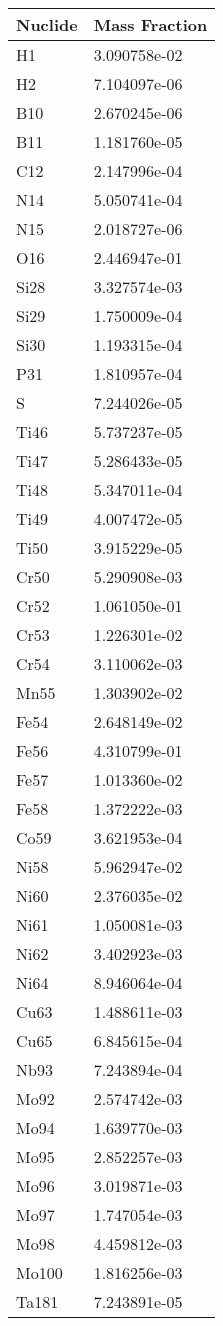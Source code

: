 \begin{centering}
\begin{longtable}[ht!]
{ p{} | p{} }
\hline
Nuclide & Mass Fraction\\
\hline
H1 & 3.090758e-02\\
H2 & 7.104097e-06\\
B10 & 2.670245e-06\\
B11 & 1.181760e-05\\
C12 & 2.147996e-04\\
N14 & 5.050741e-04\\
N15 & 2.018727e-06\\
O16 & 2.446947e-01\\
Si28 & 3.327574e-03\\
Si29 & 1.750009e-04\\
Si30 & 1.193315e-04\\
P31 & 1.810957e-04\\
S & 7.244026e-05\\
Ti46 & 5.737237e-05\\
Ti47 & 5.286433e-05\\
Ti48 & 5.347011e-04\\
Ti49 & 4.007472e-05\\
Ti50 & 3.915229e-05\\
Cr50 & 5.290908e-03\\
Cr52 & 1.061050e-01\\
Cr53 & 1.226301e-02\\
Cr54 & 3.110062e-03\\
Mn55 & 1.303902e-02\\
Fe54 & 2.648149e-02\\
Fe56 & 4.310799e-01\\
Fe57 & 1.013360e-02\\
Fe58 & 1.372222e-03\\
Co59 & 3.621953e-04\\
Ni58 & 5.962947e-02\\
Ni60 & 2.376035e-02\\
Ni61 & 1.050081e-03\\
Ni62 & 3.402923e-03\\
Ni64 & 8.946064e-04\\
Cu63 & 1.488611e-03\\
Cu65 & 6.845615e-04\\
Nb93 & 7.243894e-04\\
Mo92 & 2.574742e-03\\
Mo94 & 1.639770e-03\\
Mo95 & 2.852257e-03\\
Mo96 & 3.019871e-03\\
Mo97 & 1.747054e-03\\
Mo98 & 4.459812e-03\\
Mo100 & 1.816256e-03\\
Ta181 & 7.243891e-05\\


\end{longtable}
\end{centering}
